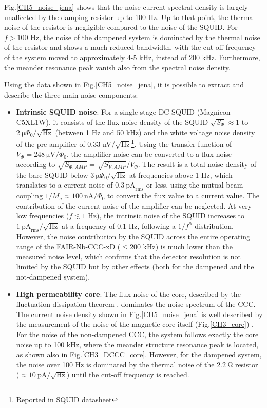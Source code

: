 \documentclass[12pt,a4paper]{report}
\begin{document}
        Fig.\ref{CH5_noise_jena} shows that the noise current spectral density is largely unaffected by the damping resistor up to 100 Hz. Up to that point, the thermal noise of the resistor is negligible compared to the noise of the SQUID. For $f > 100$ Hz, the noise of the dampened system is dominated by the thermal noise of the resistor and shows a much-reduced bandwidth, with the cut-off frequency of the system moved to approximately 4-5 kHz, instead of 200 kHz. Furthermore, the meander resonance peak vanish also from the spectral noise density.
        
        Using the data shown in Fig.\ref{CH5_noise_jena}, it is possible to extract and describe the three main noise components:
        
        \begin{itemize}
        	\item \textbf{Intrinsic SQUID noise}: For a single-stage DC SQUID (Magnicon C5XL1W), it consists of the flux noise density of the SQUID $\sqrt{S_\Phi} \approx 1$ to $\SI{2}{\micro\Phi_0}/\sqrt{\text{Hz}}$ (between 1 Hz and 50 kHz) and the white voltage noise density of the pre-amplifier of 0.33 nV/$\sqrt{\text{Hz}}$\footnote{Reported in SQUID datasheet}. Using the transfer function of $V_\Phi = \SI{248}{\micro\volt}/\Phi_0$, the amplifier noise can be converted to a flux noise according to $\sqrt{S_{\Phi,AMP}} = \sqrt{S_{V,AMP}}/V_\Phi$. The result is a total noise density of the bare SQUID below $\SI{3}{\micro\Phi_0}/\sqrt{\text{Hz}}$ at frequencies above 1 Hz, which translates to a current noise of $\SI{0.3}{\pico\ampere}_{\text{rms}}$ or less, using the mutual beam coupling $1/M_a \approx \SI{100}{\nano\ampere}/\Phi_0$ to convert the flux value to a current value. The contribution of the current noise of the amplifier can be neglected. At very low frequencies ($f\lesssim 1$ Hz), the intrinsic noise of the SQUID increases to $\SI{1}{\pico\ampere}_{\text{rms}}/\sqrt{\text{Hz}}$ at a frequency of 0.1 Hz, following a $1/f^\alpha$-distribution. However, the noise contribution by the SQUID across the entire operating range of the FAIR-Nb-CCC-xD ($\leq 200$ kHz) is much lower than the measured noise level, which confirms that the detector resolution is not limited by the SQUID but by other effects (both for the dampened and the not-dampened system).
        	\item \textbf{High permeability core}: The flux noise of the core, described by the fluctuation-dissipation theorem \cite{Volker_IEEE}, dominates the noise spectrum of the CCC. The current noise density shown in Fig.\ref{CH5_noise_jena} is well described by the measurement of the noise of the magnetic core itself (Fig.\ref{CH3_core}) \cite{Geithner_core}. For the noise of the non-dampened CCC, the system follows exactly the core noise up to 100 kHz, where the meander structure resonance peak is located, as shown also in Fig.\ref{CH3_DCCC_core}. However, for the dampened system, the noise over 100 Hz is dominated by the thermal noise of the $\SI{2.2}{\ohm}$ resistor ($\approx \SI{10}{\pico\ampere}/\sqrt{\text{Hz}}$) until the cut-off frequency is reached.

\end{itemize}
\end{document}
